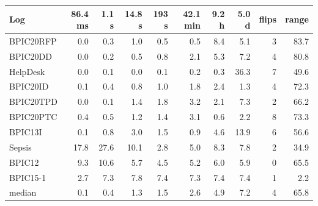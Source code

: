 \begin{tabular}{lrrrrrrrrr}
\toprule
Log & 86.4 ms & 1.1 s & 14.8 s & 193 s & 42.1 min & 9.2 h & 5.0 d & flips & range \\
\midrule
BPIC20RFP & 0.0 & 0.3 & 1.0 & 0.5 & 0.5 & 8.4 & 5.1 & 3 & 83.7 \\
BPIC20DD & 0.0 & 0.2 & 0.5 & 0.8 & 2.1 & 5.3 & 7.2 & 4 & 80.8 \\
HelpDesk & 0.0 & 0.1 & 0.0 & 0.1 & 0.2 & 0.3 & 36.3 & 7 & 49.6 \\
BPIC20ID & 0.1 & 0.4 & 0.8 & 1.0 & 1.8 & 2.4 & 1.3 & 4 & 72.3 \\
BPIC20TPD & 0.0 & 0.1 & 1.4 & 1.8 & 3.2 & 2.1 & 7.3 & 2 & 66.2 \\
BPIC20PTC & 0.4 & 0.5 & 1.2 & 1.4 & 3.1 & 0.6 & 2.2 & 8 & 73.3 \\
BPIC13I & 0.1 & 0.8 & 3.0 & 1.5 & 0.9 & 4.6 & 13.9 & 6 & 56.6 \\
Sepsis & 17.8 & 27.6 & 10.1 & 2.8 & 5.0 & 8.3 & 7.8 & 2 & 34.9 \\
BPIC12 & 9.3 & 10.6 & 5.7 & 4.5 & 5.2 & 6.0 & 5.9 & 0 & 65.5 \\
BPIC15-1 & 2.7 & 7.3 & 7.8 & 7.4 & 7.3 & 7.4 & 7.4 & 1 & 2.2 \\
median & 0.1 & 0.4 & 1.3 & 1.5 & 2.6 & 4.9 & 7.2 & 4 & 65.8 \\
\bottomrule
\end{tabular}
